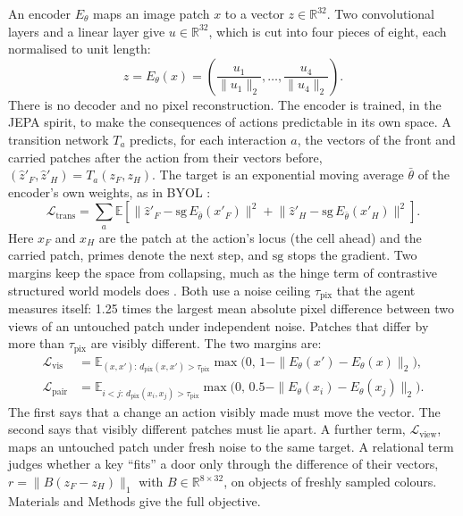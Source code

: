 \documentclass{article}
\begin{document}
An encoder $E_\theta$ maps an image patch $x$ to a vector $z\in\mathbb{R}^{32}$. Two convolutional layers and a linear layer give $u\in\mathbb{R}^{32}$, which is cut into four pieces of eight, each normalised to unit length:
\begin{equation} \label{eq:encoder}
    z = E_\theta(x) = \left(\frac{u_1}{\|u_1\|_2}, \dots, \frac{u_4}{\|u_4\|_2}\right).
\end{equation}
There is no decoder and no pixel reconstruction. The encoder is trained, in the JEPA spirit, to make the consequences of actions predictable in its own space. A transition network $T_a$ predicts, for each interaction $a$, the vectors of the front and carried patches after the action from their vectors before, $(\hat z'_F, \hat z'_H) = T_a(z_F, z_H)$. The target is an exponential moving average $\bar\theta$ of the encoder's own weights, as in BYOL \cite{Grill2020}:
\begin{equation} \label{eq:trans}
    \mathcal{L}_{\text{trans}} = \sum_{a}\mathbb{E}\left[\big\|\hat z'_F - \mathrm{sg}\,E_{\bar\theta}(x'_F)\big\|^2 + \big\|\hat z'_H - \mathrm{sg}\,E_{\bar\theta}(x'_H)\big\|^2\right].
\end{equation}
Here $x_F$ and $x_H$ are the patch at the action's locus (the cell ahead) and the carried patch, primes denote the next step, and $\mathrm{sg}$ stops the gradient. Two margins keep the space from collapsing, much as the hinge term of contrastive structured world models does \cite{Kipf2020}. Both use a noise ceiling $\tau_{\text{pix}}$ that the agent measures itself: 1.25 times the largest mean absolute pixel difference between two views of an untouched patch under independent noise. Patches that differ by more than $\tau_{\text{pix}}$ are visibly different. The two margins are:
\begin{align}
    \mathcal{L}_{\text{vis}} &= \mathbb{E}_{(x,x'):\,d_{\text{pix}}(x,x')>\tau_{\text{pix}}}\max\big(0,\,1-\|E_\theta(x')-E_\theta(x)\|_2\big), \label{eq:vis}\\
    \mathcal{L}_{\text{pair}} &= \mathbb{E}_{i<j:\,d_{\text{pix}}(x_i,x_j)>\tau_{\text{pix}}}\max\big(0,\,0.5-\|E_\theta(x_i)-E_\theta(x_j)\|_2\big). \label{eq:pair}
\end{align}
The first says that a change an action visibly made must move the vector. The second says that visibly different patches must lie apart. A further term, $\mathcal{L}_{\text{view}}$, maps an untouched patch under fresh noise to the same target. A relational term judges whether a key ``fits'' a door only through the difference of their vectors, $r=\|B(z_F-z_H)\|_1$ with $B\in\mathbb{R}^{8\times32}$, on objects of freshly sampled colours. Materials and Methods give the full objective.
\end{document}
